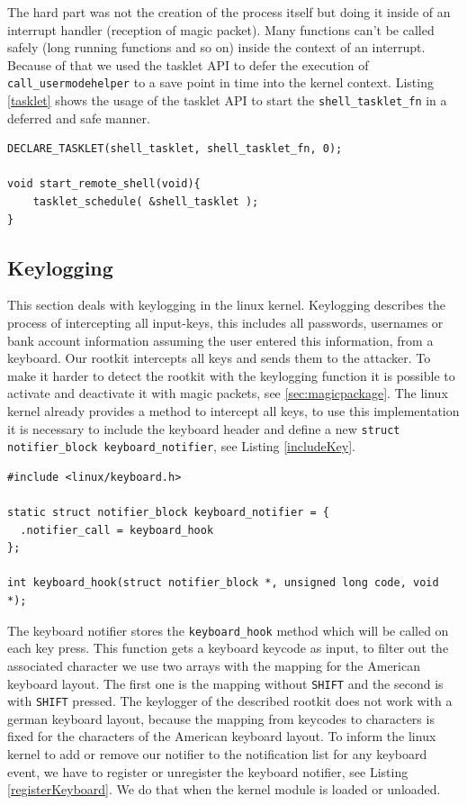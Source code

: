 \documentclass[12pt]{article}
\newcommand{\shellcmdinline}[1]{\texttt{\footnotesize #1}}
\begin{document}
The hard part was not the creation of the process itself but doing it inside of an interrupt handler (reception of magic packet). Many functions can't be called safely (long running functions and so on) inside the context of an interrupt. Because of that we used the tasklet API to defer the execution of \shellcmdinline{call\_usermodehelper} to a save point in time into the kernel context. Listing \ref{tasklet} shows the usage of the tasklet API to start the \shellcmdinline{shell\_tasklet\_fn} in a deferred and safe manner.

 \begin{lstlisting}[caption=Tasklet API., label=tasklet]
DECLARE_TASKLET(shell_tasklet, shell_tasklet_fn, 0);

void start_remote_shell(void){
	tasklet_schedule( &shell_tasklet );
}
 \end{lstlisting}



\subsection{Keylogging}
This section deals with keylogging in the linux kernel. Keylogging describes the process of intercepting all input-keys, this includes all passwords, usernames or bank account information assuming the user entered this information, from a keyboard. Our rootkit intercepts all keys and sends them to the attacker. To make it harder to detect the rootkit with the keylogging function it is possible to activate and deactivate it with magic packets, see \ref{sec:magicpackage}.  \newline
The linux kernel already provides a method to intercept all keys, to use this implementation it is necessary to include the keyboard header and define a new \lstinline{struct notifier_block keyboard_notifier}, see Listing \ref{includeKey}. \cite{f6}

\begin{lstlisting}[caption=Keyboard header., label=includeKey]
#include <linux/keyboard.h>

static struct notifier_block keyboard_notifier = {
  .notifier_call = keyboard_hook
};

int keyboard_hook(struct notifier_block *, unsigned long code, void *);
\end{lstlisting}


The keyboard notifier stores the \lstinline{keyboard_hook} method which will be called on each key press. This function gets a keyboard keycode as input, to filter out the associated character we use two arrays with the mapping for the American keyboard layout. The first one is the mapping without \lstinline{SHIFT} and the second is with \lstinline{SHIFT} pressed. The keylogger of the described rootkit does not work with a german keyboard layout, because the mapping from keycodes to characters is fixed for the characters of the American keyboard layout. 
To inform the linux kernel to add or remove our notifier to the notification list for any keyboard event, we have to register or unregister the keyboard notifier, see Listing \ref{registerKeyboard}. We do that when the kernel module is loaded or unloaded.
\end{document}
